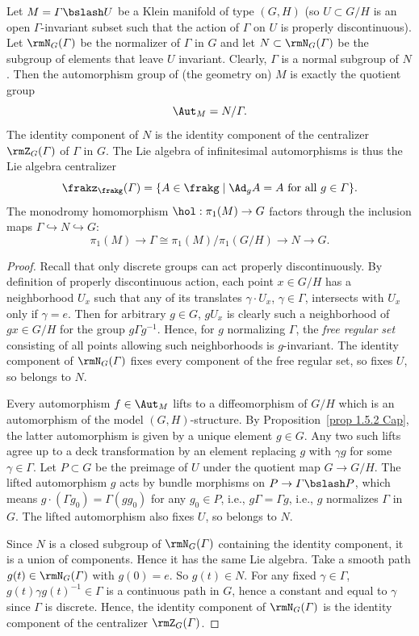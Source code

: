\begin{thm}
    Let $M=\varGamma\bslash U$ be a Klein manifold of type $(G,H)$ (so $U\subset G\slash H$ is an open $\varGamma$-invariant subset such that the action of $\varGamma$ on $U$ is properly discontinuous). Let $\rmN_G(\varGamma)$ be the normalizer of $\varGamma$ in $G$ and let $N\subset \rmN_G(\varGamma)$ be the subgroup of elements that leave $U$ invariant. Clearly, $\varGamma$ is a normal subgroup of $N$. Then the automorphism group of (the geometry on) $M$ is exactly the quotient group
    \[\Aut_M=N\slash \varGamma.\]
    The identity component of $N$ is the identity component of the centralizer $\rmZ_G(\varGamma)$ of $\varGamma$ in $G$. The Lie algebra of infinitesimal automorphisms is thus the Lie algebra centralizer 
    \[\frakz_\frakg(\varGamma)=\{A\in\frakg\mid \Ad_g A=A\text{ for all }g\in\varGamma\}.\]
    The monodromy homomorphism $\hol:\pi_1(M)\to G$ factors through the inclusion maps $\varGamma\hookrightarrow N\hookrightarrow G$:
    \[\pi_1(M)\to \varGamma\cong \pi_1(M)\slash \pi_1(G\slash H)\to N\to G.\] 
\end{thm}
\begin{proof}
    Recall that only discrete groups can act properly discontinuously. By definition of properly discontinuous action, each point $x\in G\slash H$ has a neighborhood $U_x$ such that any of its translates $\gamma\cdot U_x$, $\gamma\in\varGamma$, intersects with $U_x$ only if $\gamma=e$. Then for arbitrary $g\in G$, $gU_x$ is clearly such a neighborhood of $gx\in G\slash H$ for the group $g\varGamma g^{-1}$. Hence, for $g$ normalizing $\varGamma$, the \emph{free regular set}  consisting of all points allowing such neighborhoods is $g$-invariant. The identity component of $\rmN_G(\varGamma)$ fixes every component of the free regular set, so fixes $U$, so belongs to $N$. 

    Every automorphism $f\in \Aut_M$ lifts to a diffeomorphism of $G\slash H$ which is an automorphism of the model $(G,H)$-structure. By Proposition~\ref{prop 1.5.2 Cap}, the latter automorphism is given by a unique element $g\in G$. Any two such lifts agree up to a deck transformation by an element replacing $g$ with $\gamma g$ for some $\gamma\in\varGamma$. Let $P\subset G$ be the preimage of $U$ under the quotient map $G\to G\slash H$. The lifted automorphism $g$ acts by bundle morphisms on $P\to \varGamma\bslash P$, which means $g\cdot (\varGamma g_0)=\varGamma (gg_0)$ for any $g_0\in P$, i.e., $g\varGamma=\varGamma g$, i.e., $g$ normalizes $\varGamma$ in $G$. The lifted automorphism also fixes $U$, so belongs to $N$.

    Since $N$ is a closed subgroup of $\rmN_G(\varGamma)$ containing the identity component, it is a union of components. Hence it has the same Lie algebra. Take a smooth path $g(t)\in \rmN_G(\varGamma)$ with $g(0)=e$. So $g(t)\in N$. For any fixed $\gamma\in\varGamma$, $g(t)\gamma g(t)^{-1}\in\varGamma$ is a continuous path in $G$, hence a constant and equal to $\gamma$ since $\varGamma$ is discrete. Hence, the identity component of $\rmN_G(\varGamma)$ is the identity component of the centralizer $\rmZ_G(\varGamma)$.
\end{proof}

